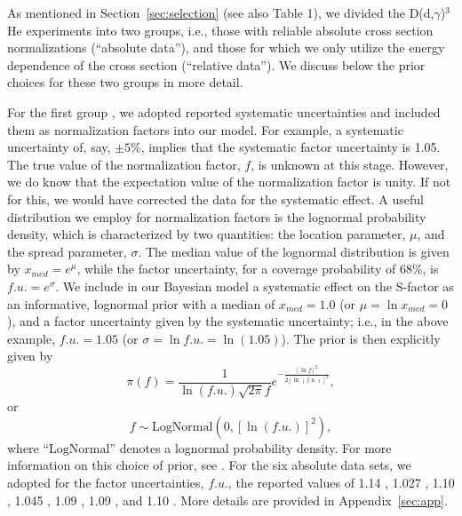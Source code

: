 \documentclass[twocolumn]{aastex63}
\begin{document}
As mentioned in Section~\ref{sec:selection} (see also Table 1), we divided the D(d,$\gamma$)$^3$He experiments into two groups, i.e., those with reliable absolute cross section normalizations (``absolute data''), and those for which we only utilize the energy dependence of the cross section (``relative data''). We discuss below the prior choices for these two groups in more detail. 

For the first group \citep{War63,Ma97,Sch97,Cas02,Tisma:2019ug,Mossa20,Turkat21}, we adopted reported systematic uncertainties and included them as normalization factors into our model. For example, a systematic uncertainty of, say, $\pm5\%$, implies that the systematic factor uncertainty is 1.05. The true value of the normalization factor, $f$, is unknown at this stage. However, we do know that the expectation value of the normalization factor is unity. If not for this, we would have corrected the data for the systematic effect. A useful distribution we employ for normalization factors is the lognormal probability density, which is characterized by two quantities: the location parameter, $\mu$, and the spread parameter, $\sigma$. The median value of the lognormal distribution is given by $x_{med} = e^{\mu}$, while the factor uncertainty, for a coverage probability of $68\%$, is $f.u. = e^{\sigma}$. We include in our Bayesian model a systematic effect on the S-factor as an informative, lognormal prior with a median of $x_{med} = 1.0$ (or $\mu = \ln x_{med}=0$), and a factor uncertainty given by the systematic uncertainty; i.e., in the above example, $f.u. = 1.05$ (or $\sigma = \ln f.u. = \ln (1.05)$). The prior is then explicitly given by 
%
\begin{equation}
\label{eq:lognor}
 \pi(f) = \frac{1}{\ln (f.u.) \sqrt{2\pi}f}e^{-\frac{[\ln f]^2}{2[\ln (f.u.)]^2}},
\end{equation}
%
or
%
\begin{equation}
\label{eq:lognor2}
f \sim \mathrm{LogNormal}(0, [\ln (f.u.)]^2),
\end{equation}
%
where ``$\mathrm{LogNormal}$'' denotes a lognormal probability density. For more information on this choice of prior, see \citet{iliadis16}. For the six absolute data sets, we adopted for the factor uncertainties, $f.u.$, the reported values of 1.14 \citep{Turkat21}, 1.027 \citep{Mossa20}, 1.10 \citep{Tisma:2019ug}, 1.045 \citep{Cas02}, 1.09 \citep{Sch97}, 1.09 \citep{Ma97}, and 1.10 \citep{War63}. More details are provided in Appendix~\ref{sec:app}.

 
\end{document}
